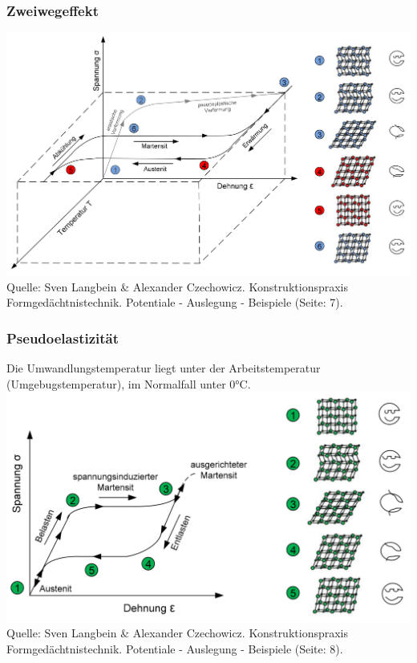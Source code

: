 \begin{frame}[t]\frametitle{Zweiwegeffekt}
	\centering
	\includegraphics[height=0.5\textwidth]{medien/Verhalten_beim_Zweiwegeffekt.png}
	\\
	\tiny{Quelle: Sven Langbein \& Alexander Czechowicz. Konstruktionspraxis
	Formgedächtnistechnik. Potentiale - Auslegung - Beispiele (Seite: 7).}
\end{frame}

\label{fgl:pseudoelastizität}
\begin{frame}[c]\frametitle{Pseudoelastizität}
	Die Umwandlungstemperatur liegt unter der Arbeitstemperatur
	(Umgebugstemperatur), im Normalfall unter 0°C.\\
	\centering
	\includegraphics[height=0.5\textwidth]{medien/Verhalten_beim_pseudoelastischen_Effekt.png}
	\\
	\tiny{Quelle: Sven Langbein \& Alexander Czechowicz. Konstruktionspraxis
	Formgedächtnistechnik. Potentiale - Auslegung - Beispiele (Seite: 8).}
\end{frame}

